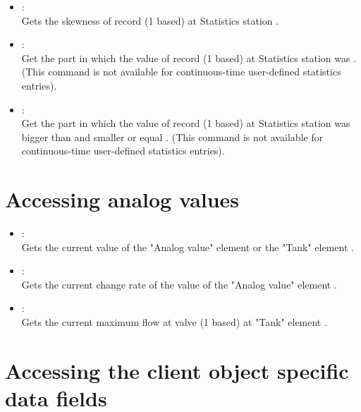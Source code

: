 \begin{itemize}
\item
{}:\\
Gets the skewness of record  (1 based) at Statistics station .

\item
{}:\\
Get the part in which the value of record  (1 based) at Statistics station  was .
(This command is not available for continuous-time user-defined statistics entries).

\item
{}:\\
Get the part in which the value of record  (1 based) at Statistics station  was bigger than  and smaller or equal .
(This command is not available for continuous-time user-defined statistics entries).

\end{itemize}



\section{Accessing analog values}
  
\begin{itemize}

\item
{}:\\
Gets the current value of the "Analog value" element or the "Tank" element .

\item
{}:\\
Gets the current change rate of the value of the "Analog value" element .

\item
{}:\\
Gets the current maximum flow at valve  (1 based) at "Tank" element .

\end{itemize}



\section{Accessing the client object specific data fields}

